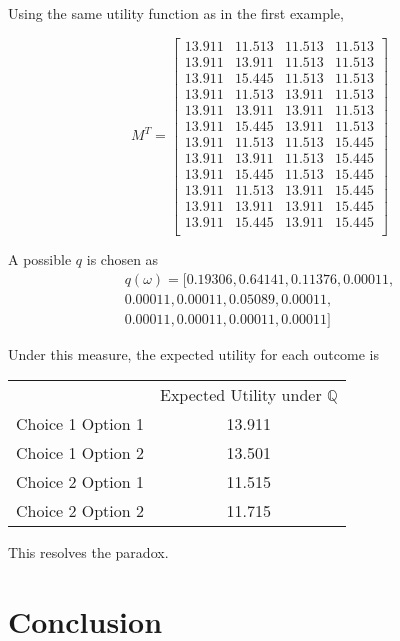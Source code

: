\documentclass{article}
\begin{document}
Using the same utility function as in the first example,

\[M^T=\begin{bmatrix}
	13.911 & 11.513 & 11.513 & 11.513  \\
	13.911 & 13.911  & 11.513 & 11.513 \\
	13.911 & 15.445 & 11.513 & 11.513 \\
	13.911 & 11.513 & 13.911 & 11.513 \\
	13.911 & 13.911  & 13.911 & 11.513 \\
	13.911 & 15.445  & 13.911 & 11.513 \\
	13.911 & 11.513 & 11.513  & 15.445 \\
	13.911 & 13.911  & 11.513  & 15.445 \\
	13.911 & 15.445  & 11.513  & 15.445 \\
	13.911 & 11.513  & 13.911  & 15.445 \\
	13.911 & 13.911  & 13.911  & 15.445 \\
	13.911 & 15.445  & 13.911  & 15.445 \\
\end{bmatrix}\]


A possible \(q\) is chosen as 
\begin{equation*}
\begin{aligned}
q(\omega)=[0.19306, 0.64141, 0.11376, 0.00011, \\ 
0.00011, 0.00011, 0.05089, 0.00011, \\
0.00011, 0.00011, 0.00011, 0.00011]
\end{aligned}
\end{equation*}

Under this measure, the expected utility for each outcome is 

\begin{center} 
	\begin{tabular}{c c}
		& Expected Utility under \(\mathbb{Q}\) \\
		Choice 1 Option 1 & 13.911 \\
		Choice 1 Option 2 & 13.501 \\
		Choice 2 Option 1 & 11.515 \\
		Choice 2 Option 2 & 11.715 \\
	\end{tabular}
\end{center}

This resolves the paradox.  

\section{Conclusion}
\end{document}
